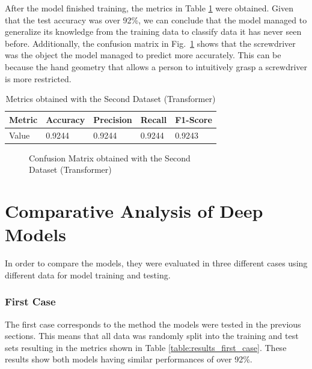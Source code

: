 After the model finished training, the metrics in Table \ref{table:transformer_dataset2_results} were obtained. Given that the test accuracy was over 92\%, we can conclude that the model managed to generalize its knowledge from the training data to classify data it has never seen before. Additionally, the confusion matrix in Fig.~\ref{fig:transformer_dataset2_confusion_matrix} shows that the screwdriver was the object the model managed to predict more accurately. This can be because the hand geometry that allows a person to intuitively grasp a screwdriver is more restricted.

\begin{table}[H]
    \centering
    \caption{Metrics obtained with the Second Dataset (Transformer)}
    \label{table:transformer_dataset2_results}
    \begin{tabular}{|l|l|l|l|l|}
        \hline
        Metric & Accuracy & Precision & Recall & F1-Score \\
        \hline
        Value & 0.9244 & 0.9244 & 0.9244 & 0.9243 \\
        \hline
    \end{tabular}
\end{table}

\begin{figure}[H]
    \centering
    {\fontsize{10}{12}\selectfont}
    \caption[Confusion Matrix obtained with the Second Dataset (Transformer)]{Confusion Matrix obtained with the Second\\Dataset (Transformer)}
    \label{fig:transformer_dataset2_confusion_matrix}
\end{figure}

\section{Comparative Analysis of Deep Models}

In order to compare the models, they were evaluated in three different cases using different data for model training and testing.

\subsubsection{First Case}

The first case corresponds to the method the models were tested in the previous sections. This means that all data was randomly split into the training and test sets resulting in the metrics shown in Table \ref{table:results_first_case}. These results show both models having similar performances of over 92\%.


